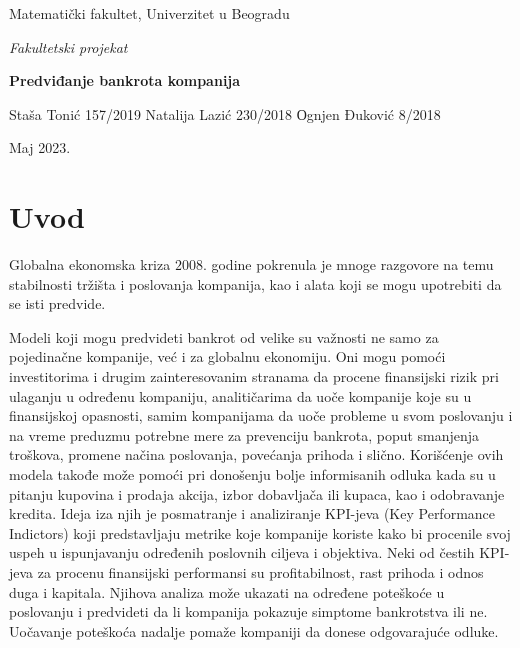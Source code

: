 \documentclass[12pt]{article}
\theoremstyle{definition}
\theoremstyle{remark}
\begin{document}
\begin{titlepage}
\noindent\begin{minipage}{0.5\linewidth}
\Large Matematički fakultet,\newline
Univerzitet u Beogradu
\end{minipage}
\vspace{7cm}

\noindent\hrulefill
\begin{center}
    {\it\large Fakultetski projekat}
    
    \vspace{0.25cm}
    {\bf\LARGE Predviđanje bankrota kompanija }
\end{center}
\hrulefill

\vspace{8cm}

\noindent\begin{minipage}{0.5\linewidth}
\Large\sc Staša Tonić 157/2019\newline
Natalija Lazić 230/2018 \newline
Оgnjen Đuković 8/2018
\end{minipage}

\vfill
\begin{center}
    \Large Maj 2023.
\end{center}
\end{titlepage}
\renewcommand\contentsname{Sadržaj}
\tableofcontents\thispagestyle{empty}\newpage

\section{Uvod}
\vspace{0.5 cm}
Globalna ekonomska kriza $2008.$ godine pokrenula je mnoge razgovore na temu stabilnosti tržišta i poslovanja kompanija, kao i alata koji se mogu upotrebiti da se isti predvide. 

Modeli koji mogu predvideti bankrot od velike su važnosti ne samo za pojedinačne kompanije, već i za globalnu ekonomiju. Oni mogu pomoći investitorima i drugim zainteresovanim stranama da procene finansijski rizik pri ulaganju u određenu kompaniju, analitičarima da uoče kompanije koje su u finansijskoj opasnosti, samim kompanijama da uoče probleme u svom poslovanju i na vreme preduzmu potrebne mere za prevenciju bankrota, poput smanjenja troškova, promene načina poslovanja, povećanja prihoda i slično. Korišćenje ovih modela takođe može pomoći pri donošenju bolje informisanih odluka kada su u pitanju kupovina i prodaja akcija, izbor dobavljača ili kupaca, kao i odobravanje kredita. Ideja iza njih je posmatranje i analiziranje KPI-jeva (Key Performance Indictors) koji predstavljaju metrike koje kompanije koriste kako bi procenile svoj uspeh u ispunjavanju određenih poslovnih ciljeva i objektiva. Neki od čestih KPI-jeva za procenu finansijski performansi su profitabilnost, rast prihoda i odnos duga i kapitala. Njihova analiza može ukazati na određene poteškoće u poslovanju i predvideti da li kompanija pokazuje simptome bankrotstva ili ne. Uočavanje poteškoća nadalje pomaže kompaniji da donese odgovarajuće odluke.  
\end{document}
